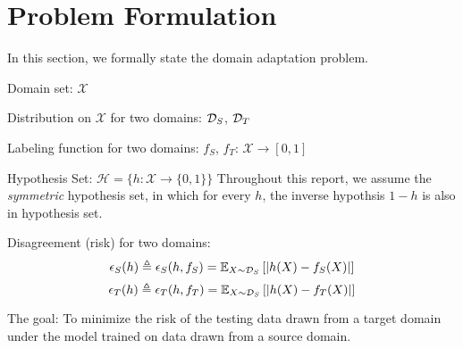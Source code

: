 \section{Problem Formulation}
In this section, we formally state the domain adaptation problem.

Domain set: $\mathcal{X}$

Distribution on $\mathcal{X}$ for two domains: $\mathcal{D}_S$, $\mathcal{D}_T$

Labeling function for two domains: $f_S$, $f_T$: $\mathcal{X} \rightarrow [0, 1]$

Hypothesis Set: $\mathcal{H}=\{h:\mathcal{X} \rightarrow \{0,1\}\}$
Throughout this report, we assume the \textit{symmetric} hypothesis set, in which for every $h$, the inverse hypothsis $1-h$ is also in hypothesis set.

Disagreement (risk) for two domains:
$$\epsilon_{S}(h) \triangleq \epsilon_{S}(h, f_S) = \mathbb{E}_{X \sim \mathcal{D}_S}\left[\left \lvert h(X) - f_S(X) \right \rvert\right]$$
$$\epsilon_{T}(h) \triangleq \epsilon_{T}(h, f_T) = \mathbb{E}_{X \sim \mathcal{D}_S}\left[\left \lvert h(X) - f_T(X) \right \rvert\right]$$

The goal: To minimize the risk of the testing data drawn from a target domain under the model trained on data drawn from a source domain.